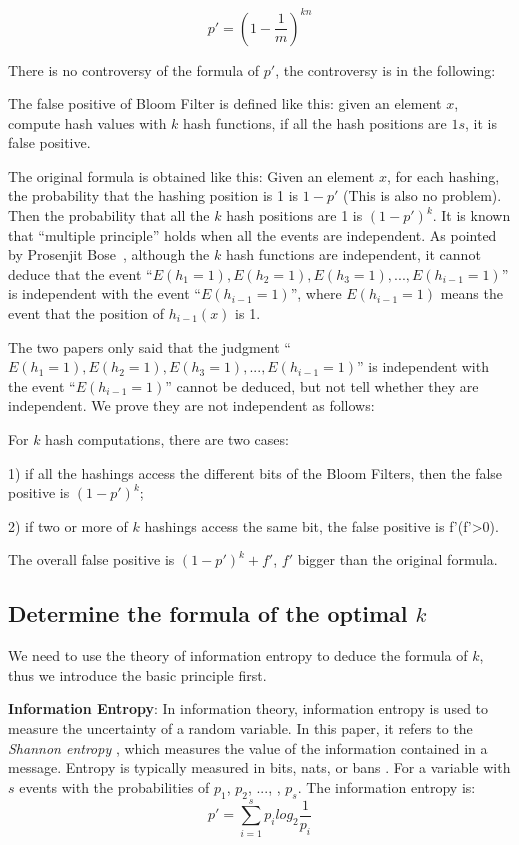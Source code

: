 \begin{equation}
\label{p'form}
p'=\left(1-\frac{1}{m}\right)^{kn}
\end{equation}


There is no controversy of the formula of $p'$, the controversy is in the following:

The false positive of Bloom Filter is defined like this: given an element $x$, compute hash values with $k$ hash functions, if all the hash positions are $1s$, it is false positive.
 
The original formula is obtained like this: Given an element $x$, for each hashing, the probability that the hashing position is 1 is $1-p'$ (This is also no problem). Then the probability that all the $k$ hash positions are 1 is $(1-p')^k$. It is known that ``multiple principle'' holds when all the events are independent. As pointed by Prosenjit Bose~\cite{bose2008false}, although the $k$ hash functions are independent, it cannot deduce that the event ``$E(h_1=1),E(h_2=1),E(h_3=1),...,E(h_{i-1}=1)$'' is independent with the event ``$E(h_{i-1}=1)$'', where $E(h_{i-1}=1)$ means the event that the position of $h_{i-1}(x)$ is 1. 

The two papers only said that the judgment ``$E(h_1=1),E(h_2=1),E(h_3=1),...,E(h_{i-1}=1)$'' is independent with the event ``$E(h_{i-1}=1)$'' cannot be deduced, but not tell whether they are independent. We prove they are not independent as follows:

For $k$ hash computations, there are two cases:

1) if all the hashings access the different bits of the Bloom Filters, then the false positive is $(1-p')^k$;

2) if two or more of $k$ hashings access the same bit, the false positive is f'(f'>0).

The overall false positive is $(1-p')^k+f'$, $f'$ bigger than the original formula. 



\subsection{Determine the formula of the optimal $k$}
We need to use the theory of information entropy to deduce the formula of $k$, thus we introduce the basic principle first. 

\textbf{Information Entropy}: In information theory, information entropy is used to measure the uncertainty of a random variable. In this paper, it refers to the \textit{Shannon entropy} \cite{shannon}, which measures the value of the information contained in a message.  Entropy is typically measured in bits, nats, or bans \cite{entropy}. For a variable with $s$ events with the probabilities of $p_1$, $p_2$, ..., , $p_s$. The information entropy is:
\begin{equation}
p'=\sum_{i=1}^{s}p_i  log_2 \dfrac{1}{p_i}
\end{equation}


